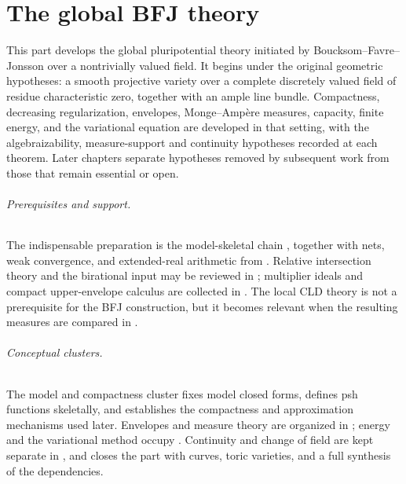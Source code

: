 \part{The global BFJ theory}
\label{part:bfj}

This part develops the global pluripotential theory initiated by
Boucksom--Favre--Jonsson over a nontrivially valued field.  It begins under the
original geometric hypotheses: a smooth projective variety over a complete
discretely valued field of residue characteristic zero, together with an
ample line bundle.  Compactness, decreasing regularization, envelopes,
Monge--Amp\`ere measures, capacity, finite energy, and the variational equation
are developed in that setting, with the algebraizability, measure-support
and continuity hypotheses recorded at each theorem. Later chapters separate hypotheses removed
by subsequent work from those that remain essential or open.

\paragraph{Prerequisites and support.}
\label{front:part3-prerequisites-and-support}
The indispensable preparation is the model-skeletal chain
, together with nets, weak
convergence, and extended-real arithmetic from
.  Relative intersection theory and the
birational input may be reviewed in
; multiplier ideals
and compact upper-envelope calculus are collected in
.  The local CLD theory is not a prerequisite for
the BFJ construction, but it becomes relevant when the resulting measures
are compared in .

\paragraph{Conceptual clusters.}
\label{front:part3-conceptual-clusters}
The model and compactness cluster
 fixes model
closed forms, defines psh functions skeletally, and establishes the
compactness and approximation mechanisms used later.  Envelopes and measure
theory are organized in
; energy and the
variational method occupy
.
Continuity and change of field are kept separate in
, and
 closes the part with curves, toric varieties, and a
full synthesis of the dependencies.

